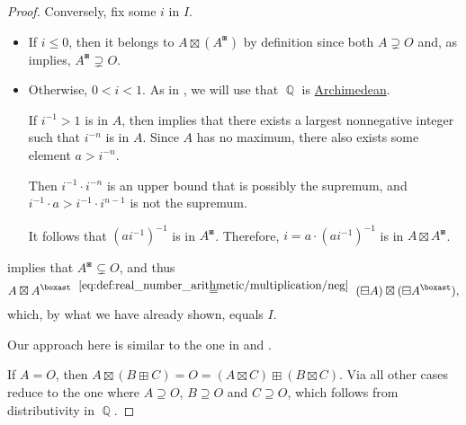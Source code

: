 \begin{proof}
  Conversely, fix some \( i \) in \( I \).
  \begin{itemize}
    \item If \( i \leq 0 \), then it belongs to \( A \boxtimes (A^\boxast) \) by definition since both \( A \supsetneq O \) and, as  implies, \( A^\boxast \supsetneq O \).

    \item Otherwise, \( 0 < i < 1 \). As in , we will use that \( \BbbQ \) is \hyperref[def:archimedean_field]{Archimedean}.

    If \( i^{-1} > 1 \) is in \( A \), then  implies that there exists a largest nonnegative integer such that \( i^{-n} \) is in \( A \). Since \( A \) has no maximum, there also exists some element \( a > i^{-n} \).

    Then \( i^{-1} \cdot i^{-n} \) is an upper bound that is possibly the supremum, and \( i^{-1} \cdot a > i^{-1} \cdot i^{n-1} \) is not the supremum.

    It follows that \( (ai^{-1})^{-1} \) is in \( A^\boxast \). Therefore, \( i = a \cdot (ai^{-1})^{-1} \) is in \( A \boxtimes A^\boxast \).
  \end{itemize}

    implies that \( A^\boxast \subsetneq O \), and thus
  \begin{equation*}
    A \boxtimes A^\boxast
    \reloset {\eqref{eq:def:real_number_arithmetic/multiplication/neg}} =
    (\boxminus A) \boxtimes (\boxminus A^\boxast),
  \end{equation*}
  which, by what we have already shown, equals \( I \).

   Our approach here is similar to the one in  and .

  If \( A = O \), then \( A \boxtimes (B \boxplus C) = O = (A \boxtimes C) \boxplus (B \boxtimes C) \). Via  all other cases reduce to the one where \( A \supseteq O \), \( B \supseteq O \) and \( C \supseteq O \), which follows from distributivity in \( \BbbQ \).


\end{proof}
